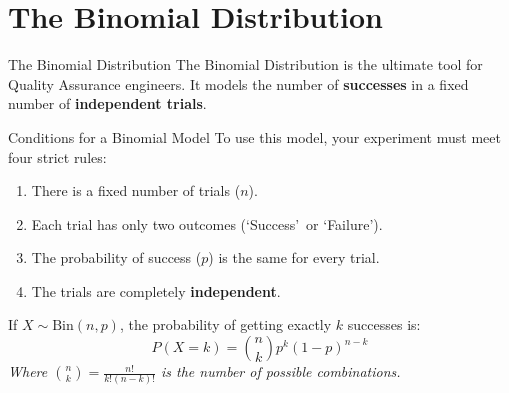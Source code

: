 \section{The Binomial Distribution}

\begin{frame}[allowframebreaks]{The Binomial Distribution}
    The Binomial Distribution is the ultimate tool for Quality Assurance engineers. It models the number of \textbf{successes} in a fixed number of \textbf{independent trials}.

    \vspace{0.2cm}
    \begin{block}{Conditions for a Binomial Model}
        To use this model, your experiment must meet four strict rules:
        \begin{enumerate}
            \item There is a fixed number of trials ($n$).
            \item Each trial has only two outcomes (\lq Success\rq\ or \lq Failure\rq).
            \item The probability of success ($p$) is the same for every trial.
            \item The trials are completely \textbf{independent}.
        \end{enumerate}
    \end{block}


    \begin{definition}
        If $X \sim \text{Bin}(n, p)$, the probability of getting exactly $k$ successes is:
        \[ P(X=k) = \binom{n}{k} p^k (1-p)^{n-k} \]
        \textit{Where $\binom{n}{k} = \frac{n!}{k!(n-k)!}$ is the number of possible combinations.}
    \end{definition}
\end{frame}

